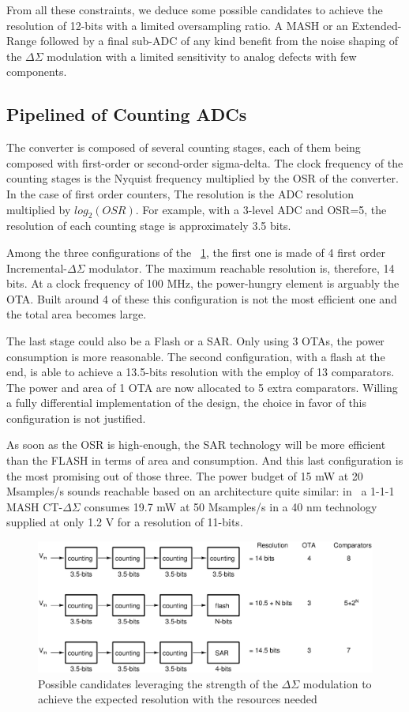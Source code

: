 From all these constraints, we deduce some possible candidates to achieve the resolution of 12-bits with a limited oversampling ratio.
A MASH or an Extended-Range followed by a final sub-ADC of any kind benefit from the noise shaping of the $\Delta\Sigma$ modulation with a limited sensitivity to analog defects with few components.

\subsection{Pipelined of Counting ADCs}
The converter is composed of several counting stages, each of them being composed with first-order or second-order sigma-delta. The clock frequency of the
counting stages is the Nyquist frequency multiplied by the OSR of the converter. In the case of first order counters, The resolution is the ADC resolution multiplied by \(log_2(OSR)\). For example, with a 3-level ADC and OSR=5, the resolution of each counting stage is approximately 3.5 bits.

Among the three configurations of the \figurename~\ref{fig:counting-candidates}, the first one is made of 4 first order Incremental-\(\Delta \Sigma\) modulator. The maximum reachable resolution is, therefore, 14 bits. At a clock frequency of 100 MHz, the power-hungry element is arguably the OTA\@. Built around 4 of these this configuration is not the most efficient one and the total area becomes large.

The last stage could also be a Flash or a SAR\@. Only using 3 OTAs, the power consumption is more reasonable. The second configuration, with a flash at the end, is able to achieve a 13.5-bits resolution with the employ of 13 comparators. The power and area of 1 OTA are now allocated to 5 extra comparators. Willing a fully differential implementation of the design, the choice in favor of this configuration is not justified.

As soon as the OSR is high-enough, the SAR technology will be more efficient than the FLASH in terms of area and consumption. And this last configuration is the most promising out of those three. The power budget of 15 mW at 20 Msamples/s sounds reachable based on an architecture quite similar: in~\cite{Liu2017} a 1-1-1 MASH CT-\(\Delta\Sigma\) consumes 19.7 mW at 50 Msamples/s in a 40 nm technology supplied at only 1.2 V for a resolution of 11-bits.

\begin{figure}[htp]
	\centering
	\includegraphics[width=.9\textwidth]{Chapter4/Figs/study/counting-conversion.ps}
	\caption{Possible candidates leveraging the strength of the \(\Delta \Sigma\) modulation to achieve the expected resolution with the resources needed}
	\label{fig:counting-candidates}
\end{figure}

